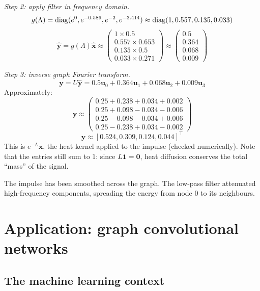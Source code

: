 \begin{notechapter}
\begin{example}
\emph{Step 2: apply filter in frequency domain.}
\[
g(\Lambda) = \operatorname{diag}(e^0, e^{-0.586}, e^{-2}, e^{-3.414})
\approx \operatorname{diag}(1, 0.557, 0.135, 0.033)
\]
\[
\hat{\mathbf{y}} = g(\Lambda) \hat{\mathbf{x}} \approx
\begin{pmatrix}
1 \times 0.5 \\
0.557 \times 0.653 \\
0.135 \times 0.5 \\
0.033 \times 0.271
\end{pmatrix}
\approx
\begin{pmatrix}
0.5 \\
0.364 \\
0.068 \\
0.009
\end{pmatrix}
\]

\emph{Step 3: inverse graph Fourier transform.}
\[
\mathbf{y} = U \hat{\mathbf{y}} = 0.5\mathbf{u}_0 + 0.364\mathbf{u}_1 +
0.068\mathbf{u}_2 + 0.009\mathbf{u}_3
\]
Approximately:
\[
\mathbf{y} \approx
\begin{pmatrix}
    0.25+0.238+0.034+0.002\\
    0.25+0.098-0.034-0.006\\
    0.25-0.098-0.034+0.006\\
    0.25-0.238+0.034-0.002
\end{pmatrix}
\]
\[
\mathbf{y} \approx [0.524, 0.309, 0.124, 0.044]^\top
\]
This is $e^{-L}\mathbf{x}$, the heat kernel applied to the impulse (checked numerically). Note that the
entries still sum to $1$: since $L\mathbf{1} = \mathbf{0}$, heat diffusion conserves the total ``mass'' of the
signal.

The impulse has been smoothed across the graph. The low-pass filter
attenuated high-frequency components, spreading the energy from node 0
to its neighbours.
\end{example}

\section{Application: graph convolutional networks}\label{dft-to-gnn:sec:gcn}

\subsection{The machine learning context}


\end{notechapter}
